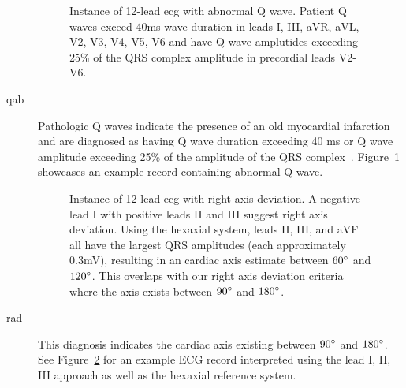 \documentclass[\main/thesis.tex]{subfiles}
\begin{document}
\begin{description}
    \begin{figure}[ht]
        \centering
        \caption{Instance of 12-lead \gls{ecg} with abnormal Q wave. Patient Q waves exceed 40ms wave duration in leads I, III, aVR, aVL, V2, V3, V4, V5, V6 and have Q wave amplutides exceeding 25\% of the QRS complex amplitude in precordial leads V2-V6.}
        \label{fig:full_QAb}
    \end{figure}
    \item[\gls{qab}]Pathologic Q waves indicate the presence of an old myocardial infarction and are diagnosed as having Q wave duration exceeding 40 ms or Q wave amplitude exceeding 25\% of the amplitude of the QRS complex~\cite{doi:10.1002/clc.4960200515}.
    Figure~\ref{fig:full_QAb} showcases an example record containing abnormal Q wave.

    \begin{figure}[ht]
        \centering
        \caption{Instance of 12-lead \gls{ecg} with right axis deviation. A negative lead I with positive leads II and III suggest right axis deviation. Using the hexaxial system, leads II, III, and aVF all have the largest QRS amplitudes (each approximately 0.3mV), resulting in an cardiac axis estimate between $60\degree$ and $120\degree$. This overlaps with our right axis deviation criteria where the axis exists between $90\degree$ and $180\degree$.}
        \label{fig:full_RAD}
    \end{figure}
    \item[\gls{rad}] This diagnosis indicates the cardiac axis existing between $90\degree$ and $180\degree$. See Figure~\ref{fig:full_RAD} for an example ECG record interpreted using the lead I, II, III approach as well as the hexaxial reference system.


\end{description}
\end{document}
